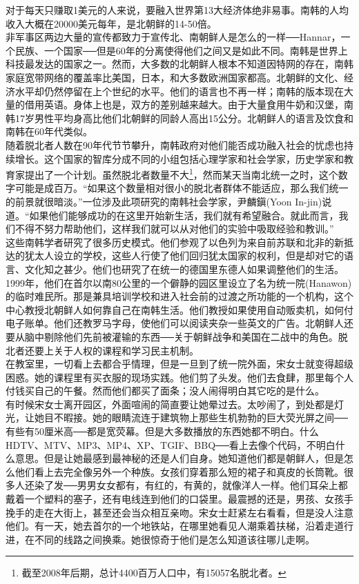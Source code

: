 对于每天只赚取1美元的人来说，要融入世界第13大经济体绝非易事。南韩的人均收入大概在20000美元每年，是北朝鲜的14-50倍。\\

非军事区两边大量的宣传都致力于宣传北、南朝鲜人是怎么的一样──Hannar，一个民族、一个国家──但是60年的分离使得他们之间又是如此不同。南韩是世界上科技最发达的国家之一。然而，大多数的北朝鲜人根本不知道因特网的存在，南韩家庭宽带网络的覆盖率比美国，日本，和大多数欧洲国家都高。北朝鲜的文化、经济水平却仍然停留在上个世纪的水平。他们的语言也不再一样；南韩的版本现在大量的借用英语。身体上也是，双方的差别越来越大。由于大量食用牛奶和汉堡，南韩17岁男性平均身高比他们北朝鲜的同龄人高出15公分。北朝鲜人的语言及饮食和南韩在60年代类似。\\

随着脱北者人数在90年代节节攀升，南韩政府对他们能否成功融入社会的忧虑也持续增长。这个国家的智库分成不同的小组包括心理学家和社会学家，历史学家和教育家提出了一个计划。虽然脱北者数量不大\footnote{截至2008年后期，总计4400百万人口中，有15057名脱北者。}，然而某天当南北统一之时，这个数字可能是成百万。“如果这个数量相对很小的脱北者群体不能适应，那么我们统一的前景就很暗淡。”一位涉及此项研究的南韩社会学家，尹麟鎭(Yoon In-jin)说道。“如果他们能够成功的在这里开始新生活，我们就有希望融合。就此而言，我们不得不努力帮助他们，这样我们就可以从对他们的实验中吸取经验和教训。”\\

这些南韩学者研究了很多历史模式。他们参观了以色列为来自前苏联和北非的新抵达的犹太人设立的学校，这些人行使了他们回归犹太国家的权利，但是却对它的语言、文化知之甚少。他们也研究了在统一的德国里东德人如果调整他们的生活。\\

1999年，他们在首尔以南80公里的一个僻静的园区里设立了名为统一院(Hanawon)的临时难民所。那是兼具培训学校和进入社会前的过渡之所功能的一个机构，这个中心教授北朝鲜人如何靠自己在南韩生活。他们教授如果使用自动贩卖机，如何付电子账单。他们还教罗马字母，使他们可以阅读夹杂一些英文的广告。北朝鲜人还要从脑中剔除他们先前被灌输的东西──关于朝鲜战争和美国在二战中的角色。脱北者还要上关于人权的课程和学习民主机制。\\

在教室里，一切看上去都合乎情理，但是一旦到了统一院外面，宋女士就变得超级困惑。她的课程里有买衣服的现场实践。他们剪了头发。他们去食肆，那里每个人付钱买自己的午餐。然而他们都买了面条；没人闹得明白其它吃的是什么。\\

有时候宋女士离开园区，外面喧闹的简直要让她晕过去。太吵闹了，到处都是灯光，让她目不暇接。她的眼睛流连于建筑物上那些生机勃勃的巨大荧光屏之间──有些有50厘米高──都是宽荧幕。但是大多数播放的东西她都不明白。什么HDTV、MTV、MP3、MP4、XP、TGIF、BBQ──看上去像个代码，不明白什么意思。但是让她最感到最神秘的还是人们自身。她知道他们都是朝鲜人，但是怎么他们看上去完全像另外一个种族。女孩们穿着那么短的裙子和真皮的长筒靴。很多人还染了发──男男女女都有，有红的，有黄的，就像洋人一样。他们耳朵上都戴着一个塑料的塞子，还有电线连到他们的口袋里。最震撼的还是，男孩、女孩手挽手的走在大街上，甚至还会当众相互亲吻。宋女士赶紧左右看看，但是没人注意他们。有一天，她去首尔的一个地铁站，在哪里她看见人潮乘着扶梯，沿着走道行进，在不同的线路之间换乘。她很惊奇于他们是怎么知道该往哪儿走啊。\\

